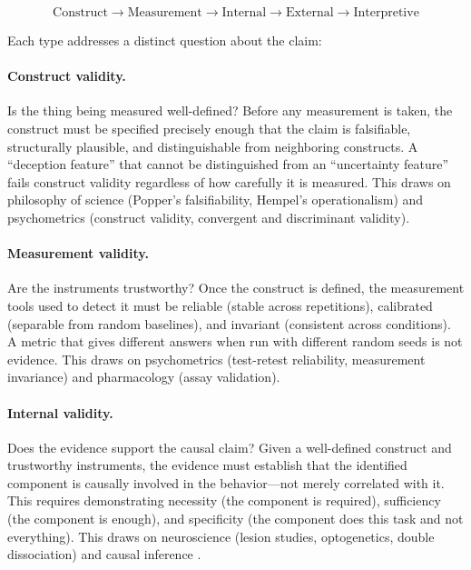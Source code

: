 \documentclass[10pt]{article}
\begin{document}
\begin{equation}
\text{Construct} \rightarrow \text{Measurement} \rightarrow \text{Internal} \rightarrow \text{External} \rightarrow \text{Interpretive}
\label{eq:dependency}
\end{equation}

Each type addresses a distinct question about the claim:

\paragraph{Construct validity.} Is the thing being measured well-defined? Before any measurement is taken, the construct must be specified precisely enough that the claim is falsifiable, structurally plausible, and distinguishable from neighboring constructs. A ``deception feature'' that cannot be distinguished from an ``uncertainty feature'' fails construct validity regardless of how carefully it is measured. This draws on philosophy of science (Popper's falsifiability, Hempel's operationalism) and psychometrics (construct validity, convergent and discriminant validity).

\paragraph{Measurement validity.} Are the instruments trustworthy? Once the construct is defined, the measurement tools used to detect it must be reliable (stable across repetitions), calibrated (separable from random baselines), and invariant (consistent across conditions). A metric that gives different answers when run with different random seeds is not evidence. This draws on psychometrics (test-retest reliability, measurement invariance) and pharmacology (assay validation).

\paragraph{Internal validity.} Does the evidence support the causal claim? Given a well-defined construct and trustworthy instruments, the evidence must establish that the identified component is causally involved in the behavior---not merely correlated with it. This requires demonstrating necessity (the component is required), sufficiency (the component is enough), and specificity (the component does this task and not everything). This draws on neuroscience (lesion studies, optogenetics, double dissociation) and causal inference \citep{pearl2009causality}.
\end{document}
